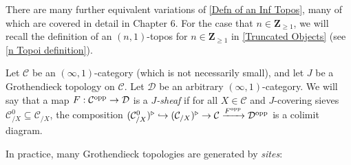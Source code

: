 \documentclass[10pt]{article}
\newcommand{\C}{\mathcal C}
\newcommand{\cD}{\mathcal{D}}
\newcommand{\ZZ}{\mathbb{Z}}
\def\ZZ{{\mathbf Z}}
\theoremstyle{witharg}
\theoremstyle{witharg}
\theoremstyle{witharg2}
\begin{document}
\noindent There are many further equivalent variations of \ref{Defn of an Inf Topos}, many of which are covered in detail in  Chapter 6. For the case that $n\in \ZZ_{\geq 1}$, we will recall the definition of an $(n,1)$-topos for $n\in \ZZ_{\geq 1}$ in \ref{Truncated Objects} (see \ref{n Topoi definition}). 




\begin{definition}{}\label{Sheaf Definition}

    Let $\C$ be an $(\infty,1)$-category (which is not necessarily small), and let $J$ be a Grothendieck topology on $\C$. Let $\cD$ be an arbitrary $(\infty,1)$-category. We will say that a map $F:\C^{\textnormal{opp}}\rightarrow \cD$ is a \emph{$J$-sheaf} if for all $X\in \C$ and $J$-covering sieves $\C^0_{/X}\subseteq \C_{/X}$, the composition $(\C^0_{/X})^\triangleright\hookrightarrow (\C_{/X})^\triangleright\rightarrow \C\xrightarrow{F^{\textnormal{opp}}}\cD^{\textnormal{opp}}$ is a colimit diagram. 
    
\end{definition}



\noindent In practice, many Grothendieck topologies are generated by \emph{sites}:
\end{document}
